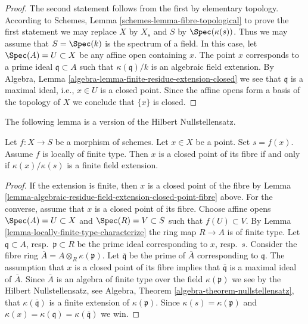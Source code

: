\begin{proof}
The second statement follows from the first by elementary topology.
According to Schemes, Lemma \ref{schemes-lemma-fibre-topological}
to prove the first statement
we may replace $X$ by $X_s$ and $S$ by $\Spec(\kappa(s))$.
Thus we may assume that $S = \Spec(k)$ is the spectrum of a field.
In this case, let $\Spec(A) = U \subset X$ be any affine open
containing $x$. The point $x$ corresponds to a prime ideal
$\mathfrak q \subset A$ such that $\kappa(\mathfrak q)/k$
is an algebraic field extension. By
Algebra, Lemma \ref{algebra-lemma-finite-residue-extension-closed}
we see that $\mathfrak q$ is a maximal ideal, i.e., $x \in U$ is a
closed point. Since the affine opens form
a basis of the topology of $X$ we conclude that $\{x\}$ is closed.
\end{proof}

\noindent
The following lemma is a version of the Hilbert Nullstellensatz.

\begin{lemma}
\label{lemma-closed-point-fibre-locally-finite-type}
Let $f : X \to S$ be a morphism of schemes.
Let $x \in X$ be a point. Set $s = f(x)$.
Assume $f$ is locally of finite type.
Then $x$ is a closed point of its fibre
if and only if $\kappa(x)/\kappa(s)$ is
a finite field extension.
\end{lemma}

\begin{proof}
If the extension is finite, then $x$ is a closed point of
the fibre by
Lemma \ref{lemma-algebraic-residue-field-extension-closed-point-fibre}
above. For the converse, assume that $x$ is a closed point
of its fibre. Choose affine opens $\Spec(A) = U \subset X$
and $\Spec(R) = V \subset S$ such that $f(U) \subset V$.
By Lemma \ref{lemma-locally-finite-type-characterize} the ring map
$R \to A$ is of finite type. Let $\mathfrak q \subset A$,
resp.\ $\mathfrak p \subset R$ be the prime ideal corresponding
to $x$, resp.\ $s$. Consider the fibre ring
$\overline{A} = A \otimes_R \kappa(\mathfrak p)$.
Let $\overline{\mathfrak q}$ be the prime of $\overline{A}$
corresponding to $\mathfrak q$. The assumption that $x$
is a closed point of its fibre implies that $\overline{\mathfrak q}$
is a maximal ideal of $\overline{A}$. Since $\overline{A}$
is an algebra of finite type over the field $\kappa(\mathfrak p)$
we see by the Hilbert Nullstellensatz, see
Algebra, Theorem \ref{algebra-theorem-nullstellensatz},
that $\kappa(\overline{\mathfrak q})$ is a finite extension
of $\kappa(\mathfrak p)$.
Since $\kappa(s) = \kappa(\mathfrak p)$ and
$\kappa(x) = \kappa(\mathfrak q) = \kappa(\overline{\mathfrak q})$
we win.
\end{proof}

